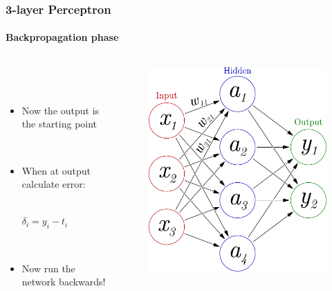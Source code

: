 \documentclass{beamer}
\newcommand{\figheight}{0.72\textheight}
\begin{document}
\begin{frame}[fragile]
\frametitle{3-layer Perceptron}
\framesubtitle{Backpropagation phase}
 \begin{columns}[T]
    \begin{column}{.45\textwidth} 
             \  \\
 \   \\   
     
     
\begin{itemize}
\item Now the output is the starting point 

\ \\

 
\item When at output calculate error: 


\ \\

 
$\delta_i = y_i - t_i $


\ \\

 

 \item Now run the network backwards! 
\end{itemize}
\end{column}
\begin{column}{.55\textwidth}
\begin{figure}[t]
 \begin{flushleft}

 \includegraphics[height = \figheight]{./fig/3-layer_maths.pdf}


 \end{flushleft}
\end{figure}
\end{column}

\end{columns}
\end{frame}
\end{document}
